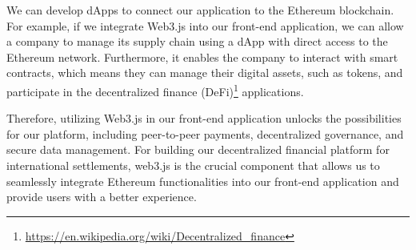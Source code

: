 We can develop dApps to connect our application to the Ethereum blockchain. For example, if we integrate Web3.js into our front-end application,
we can allow a company to manage its supply chain using a dApp with direct access to the Ethereum network. Furthermore, it enables the company to
interact with smart contracts, which means they can manage their digital assets, such as tokens,  and participate in the decentralized finance (DeFi)\footnote{\url{https://en.wikipedia.org/wiki/Decentralized_finance}}
applications.


Therefore, utilizing Web3.js in our front-end application unlocks the possibilities for our platform, including peer-to-peer payments, decentralized
governance, and secure data management. For building our decentralized financial platform for international settlements, web3.js is the crucial component that allows us to
seamlessly integrate Ethereum functionalities into our front-end application and provide users with a better experience.


